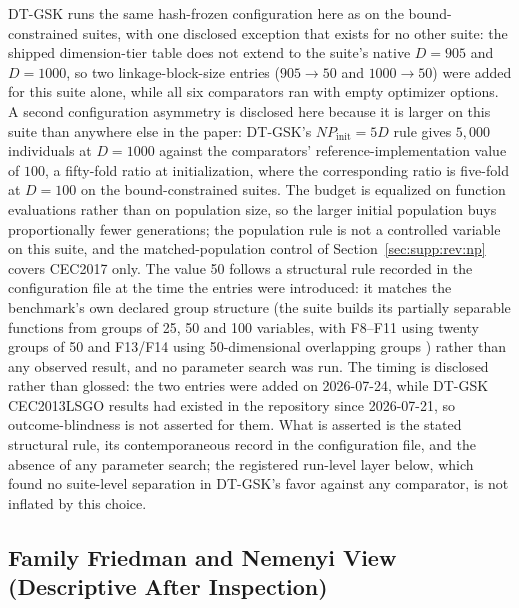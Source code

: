 \documentclass[algorithms,article,submit,moreauthors,pdftex]{Definitions/mdpi}
\newcommand{\dtgsk}{DT-GSK}
\begin{document}
\dtgsk{} runs the same hash-frozen configuration here as on the
bound-constrained suites, with one disclosed exception that exists for no
other suite: the shipped dimension-tier table does not extend to the
suite's native $D = 905$ and $D = 1000$, so two linkage-block-size entries
($905 \rightarrow 50$ and $1000 \rightarrow 50$) were added for this
suite alone, while all six comparators ran with empty optimizer options.
A second configuration asymmetry is disclosed here because it is larger on
this suite than anywhere else in the paper: \dtgsk{}'s
$NP_{\mathrm{init}} = 5D$ rule gives $5{,}000$ individuals at $D = 1000$
against the comparators' reference-implementation value of $100$, a
fifty-fold ratio at initialization, where the corresponding ratio is
five-fold at $D = 100$ on the bound-constrained suites. The budget is
equalized on function evaluations rather than on population size, so the
larger initial population buys proportionally fewer generations; the
population rule is not a controlled variable on this suite, and the
matched-population control of Section~\ref{sec:supp:rev:np} covers
CEC2017 only.
The value 50 follows a structural rule recorded in the configuration file
at the time the entries were introduced: it matches the benchmark's own
declared group structure (the suite builds its partially separable
functions from groups of 25, 50 and 100 variables, with F8--F11 using
twenty groups of 50 and F13/F14 using 50-dimensional overlapping groups%
) rather than any observed result, and no parameter search was run.
The timing is disclosed rather than glossed: the two entries were added on
2026-07-24, while \dtgsk{} CEC2013LSGO results had existed in the
repository since 2026-07-21, so outcome-blindness is not asserted for
them.  What is asserted is the stated structural rule, its contemporaneous
record in the configuration file, and the absence of any parameter
search; the registered run-level layer below, which found no suite-level
separation in \dtgsk{}'s favor against any comparator, is not inflated
by this choice.

\subsection{Family Friedman and Nemenyi View (Descriptive After Inspection)}\label{sec:supp:lsgo:ranks}
\end{document}
